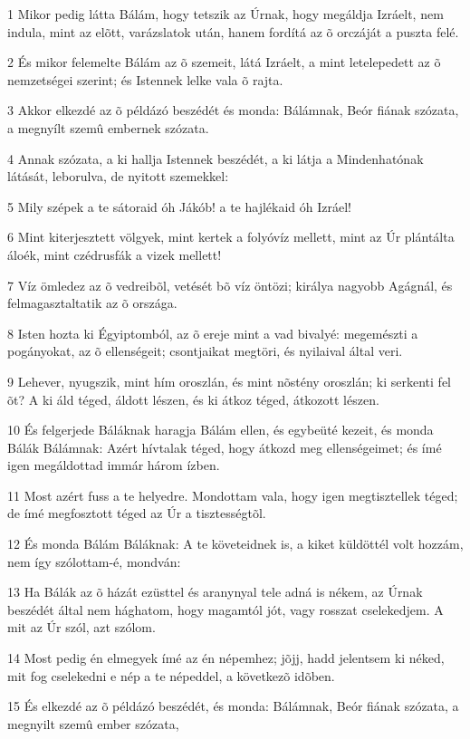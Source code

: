 \par 1 Mikor pedig látta Bálám, hogy tetszik az Úrnak, hogy megáldja Izráelt, nem indula, mint az elõtt, varázslatok után, hanem fordítá az õ orczáját a puszta felé.
\par 2 És mikor felemelte Bálám az õ szemeit, látá Izráelt, a mint letelepedett az õ nemzetségei szerint; és Istennek lelke vala õ rajta.
\par 3 Akkor elkezdé az õ példázó beszédét és monda: Bálámnak, Beór fiának szózata, a megnyílt szemû embernek szózata.
\par 4 Annak szózata, a ki hallja Istennek beszédét, a ki látja a Mindenhatónak látását, leborulva, de nyitott szemekkel:
\par 5 Mily szépek a te sátoraid óh Jákób! a te hajlékaid óh Izráel!
\par 6 Mint kiterjesztett völgyek, mint kertek a folyóvíz mellett, mint az Úr plántálta áloék, mint czédrusfák a vizek mellett!
\par 7 Víz ömledez az õ vedreibõl, vetését bõ víz öntözi; királya nagyobb Agágnál, és felmagasztaltatik az õ országa.
\par 8 Isten hozta ki Égyiptomból, az õ ereje mint a vad bivalyé: megemészti a pogányokat, az õ ellenségeit; csontjaikat megtöri, és nyilaival által veri.
\par 9 Lehever, nyugszik, mint hím oroszlán, és mint nõstény oroszlán; ki serkenti fel õt? A ki áld téged, áldott lészen, és ki átkoz téged, átkozott lészen.
\par 10 És felgerjede Báláknak haragja Bálám ellen, és egybeüté kezeit, és monda Bálák Bálámnak: Azért hívtalak téged, hogy átkozd meg ellenségeimet; és ímé igen megáldottad immár három ízben.
\par 11 Most azért fuss a te helyedre. Mondottam vala, hogy igen megtisztellek  téged; de ímé megfosztott téged az Úr a tisztességtõl.
\par 12 És monda Bálám Báláknak: A te követeidnek is, a kiket küldöttél volt hozzám, nem így szólottam-é, mondván:
\par 13 Ha Bálák az õ házát ezüsttel és aranynyal tele adná is nékem, az Úrnak beszédét által nem hághatom, hogy magamtól jót, vagy rosszat cselekedjem. A mit az  Úr szól, azt szólom.
\par 14 Most pedig én elmegyek ímé az én népemhez; jõjj, hadd jelentsem ki néked, mit fog cselekedni e nép a te népeddel, a következõ idõben.
\par 15 És elkezdé az õ példázó beszédét, és monda: Bálámnak, Beór fiának szózata, a megnyilt szemû ember szózata,
